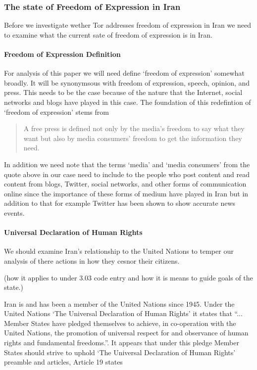 \documentclass[11pt]{article}
\begin{document}
\begin{multicols}{2}
\subsubsection{The state of Freedom of Expression in Iran}
Before we investigate wether Tor addresses freedom of expression in Iran we need
to examine what the current sate of freedom of expression is in Iran. 

\paragraph{Freedom of Expression Definition}

For analysis of this paper we will need define `freedom of expression' somewhat
broadly. It will be synonymsous with freedom of expression, speech, opinion, and
press.  This needs to be the case because of the nature that the Internet,
social networks and blogs have played in this case. The foundation of this
redefintion of `freedom of expression' stems from 
\begin{quotation} 
  A free press is defined not only by the media's freedom to say what they want
  but also by media consumers' freedom to get the information they need.
  \cite{PublicAttitudeTowardFreedomPress, ComplexRoadToHappiness}
\end{quotation}

In addition we need note that the terms `media' and `media consumers' from the
quote above in our case need to include to the people who post content and read
content from blogs, Twitter, social networks, and other forms of communication
online since the importance of these forms of medium have played in Iran but in
addition to that for example Twitter has been shown to show accurate news
events.  \cite{Twitter:BreakingNewsDetection, Twitter:IdentificationLiveEvents,
Twitter:MeasuringInfluence}


\paragraph{Universal Declaration of Human Rights}

We should examine Iran's relationship to the United Nations to temper our
analysis of there actions in how they cesnor their citizens. 

(how it applies to under 3.03 code entry and how it is means to guide goals of
the state.)

Iran is and has been a member of the United Nations since 1945.
\cite{UN:IranBecameMember, UN:IranActiveMember} Under the United Nations `The
Universal Declaration of Human Rights' it states that ``...  Member States have
pledged themselves to achieve, in co-operation with the United Nations, the
promotion of universal respect for and observance of human rights and
fundamental freedoms.''\cite{UniversalDeclerationOfHumanRights}. It appears that
under this pledge Member States should strive to uphold `The Universal
Declaration of Human Rights' preamble and articles, Article 19 states


\end{multicols}
\end{document}

